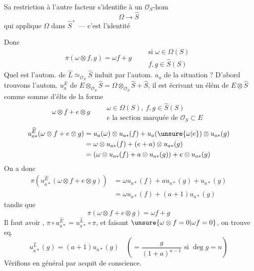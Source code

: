 Sa restriction à l'autre facteur s'identifie à un $\mathcal{O}_S$-hom
\[
\Omega\longrightarrow\widehat S
\]
qui applique $\Omega$ dans $\widehat S^+$ --- c'est l'identité

Donc
\[
\pi(\omega\otimes f,g)=\omega f+g\qquad
\begin{gathered}\text{si }\omega\in\Omega(S)\\f,g\in\widehat S(S)\end{gathered}
\]
Quel est l'autom. de $\widehat L\simeq_{\mathcal{O}_S}\widehat S$ induit par l'autom. $u_a$ de la situation ? D'abord trouvons l'autom. $u_a^E$ de $E\otimes_{\mathcal{O}_S}\widehat S=\Omega\otimes_{\mathcal{O}_S}\widehat S+\widehat S$, il est 
écrivant un élém de $E\otimes\widehat S$  comme somme d'élts de la forme
\[
\omega\otimes f+e\otimes g\qquad
\begin{gathered}\omega\in\Omega(S),\ f,g\in\widehat S(S)\\e\text{ la section marquée de }\mathcal{O}_S\subset E\end{gathered}
\]
\[
\begin{aligned}
u_{a*}^{\widehat E}(\omega\otimes f+e\otimes g)
&=u_a(\omega)\otimes u_{a*}(f)+u_a(\unsure{\omega|e})\otimes u_{a*}(g)\\
&=\omega\otimes u_{a*}(f)+(e+a)\otimes u_{a*}(g)\\
&=(\omega\otimes u_{a*}(f)+a\otimes u_{a*}(g))+e\otimes u_{a*}(g)
\end{aligned}
\]
On a donc
\[
\begin{aligned}
\pi(u_{a*}^{\widehat E}(\omega\otimes f+e\otimes g))
&=\omega u_{a*}(f)+a u_{a*}(g)+u_{a*}(g)\\
&=\omega u_{a*}(f)+(a+1)u_{a*}(g)
\end{aligned}
\]
tandis que
\[
\pi(\omega\otimes f+e\otimes g)=\omega f+g
\]
Il faut avoir
, $\pi\circ u_{a*}^{\widehat E}=u_{a*}^{\widehat L}\circ\pi$, et faisant $\unsure{\omega\otimes f=0|\omega f=0}$, on trouve eq.
\[
\boxed{u_{a*}^{\widehat L}(g)=(a+1)u_{a*}(g)}
\quad\left(=\frac{g}{(1+a)^{n-1}}\text{ si }\deg g=n\right)
\]
Vérifions  en général par acquit de conscience.
